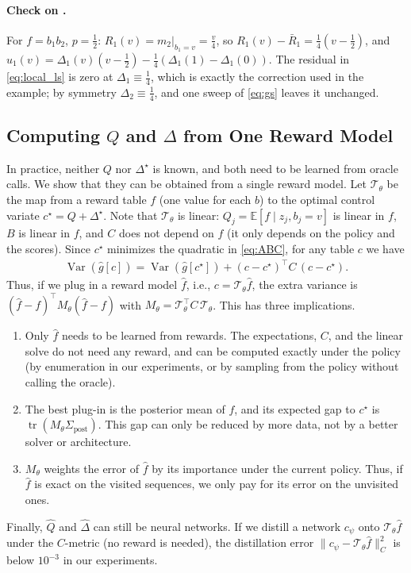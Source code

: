 \documentclass[10pt]{article}
\providecommand{\E}{\mathbb{E}}
\providecommand{\Var}{\operatorname{Var}}
\theoremstyle{plain}
\theoremstyle{definition}
\theoremstyle{remark}
\theoremstyle{definition}
\newcommand{\ctx}[1]{z_{#1}}                 %
\newcommand{\ghat}[1]{\hat g[#1]}            %
\newcommand{\Dstar}{\Delta^{\star}}
\newcommand{\cstar}{c^{\star}}
\begin{document}
\paragraph{Check on .} For $f=b_1b_2$, $p=\tfrac12$: $R_1(v)=m_2\big|_{b_1=v}=\tfrac v4$, so $R_1(v)-\bar R_1=\tfrac14(v-\tfrac12)$, and $u_1(v)=\Delta_1(v)(v-\tfrac12)-\tfrac14(\Delta_1(1)-\Delta_1(0))$. The residual in \eqref{eq:local_ls} is zero at $\Delta_1\equiv\tfrac14$, which is exactly the correction used in the example; by symmetry $\Delta_2\equiv\tfrac14$, and one sweep of \eqref{eq:gs} leaves it unchanged.

\subsection{Computing $Q$ and $\Delta$ from One Reward Model}\label{sec:plugin}
In practice, neither $Q$ nor $\Dstar$ is known, and both need to be learned from oracle calls. We show that they can be obtained from a single reward model. Let $\mathcal T_\theta$ be the map from a reward table $f$ (one value for each $b$) to the optimal control variate $\cstar=Q+\Dstar$. Note that $\mathcal T_\theta$ is linear: $Q_j=\E[f\mid\ctx{j},b_j=v]$ is linear in $f$, $B$ is linear in $f$, and $C$ does not depend on $f$ (it only depends on the policy and the scores). Since $\cstar$ minimizes the quadratic in \eqref{eq:ABC}, for any table $c$ we have
\begin{align}\label{eq:excess}
    \Var(\ghat{c})=\Var(\ghat{\cstar})+(c-\cstar)^{\top}C\,(c-\cstar).
\end{align}
Thus, if we plug in a reward model $\hat f$, i.e., $c=\mathcal T_\theta\hat f$, the extra variance is $(\hat f-f)^{\top}M_\theta(\hat f-f)$ with $M_\theta=\mathcal T_\theta^{\top}C\,\mathcal T_\theta$. This has three implications.
\begin{enumerate}[label=(\roman*)]
    \item Only $\hat f$ needs to be learned from rewards. The expectations, $C$, and the linear solve do not need any reward, and can be computed exactly under the policy (by enumeration in our experiments, or by sampling from the policy without calling the oracle).
    \item The best plug-in is the posterior mean of $f$, and its expected gap to $\cstar$ is $\operatorname{tr}(M_\theta\Sigma_{\mathrm{post}})$. This gap can only be reduced by more data, not by a better solver or architecture.
    \item $M_\theta$ weights the error of $\hat f$ by its importance under the current policy. Thus, if $\hat f$ is exact on the visited sequences, we only pay for its error on the unvisited ones.
\end{enumerate}
Finally, $\hat Q$ and $\hat\Delta$ can still be neural networks. If we distill a network $c_\psi$ onto $\mathcal T_\theta\hat f$ under the $C$-metric (no reward is needed), the distillation error $\|c_\psi-\mathcal T_\theta\hat f\|_C^2$ is below $10^{-3}$ in our experiments.
\end{document}
